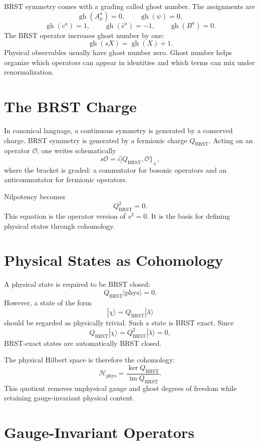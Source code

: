 BRST symmetry comes with a grading called ghost number. The assignments are
\[
    \operatorname{gh}(A_\mu^a)=0,
    \qquad
    \operatorname{gh}(\psi)=0,
\]
\[
    \operatorname{gh}(c^a)=1,
    \qquad
    \operatorname{gh}(\bar c^a)=-1,
    \qquad
    \operatorname{gh}(B^a)=0.
\]
The BRST operator increases ghost number by one:
\[
    \operatorname{gh}(sX)=\operatorname{gh}(X)+1.
\]
Physical observables usually have ghost number zero. Ghost number helps organize
which operators can appear in identities and which terms can mix under
renormalization.

\section{The BRST Charge}

In canonical language, a continuous symmetry is generated by a conserved charge.
BRST symmetry is generated by a fermionic charge \(Q_{\mathrm{BRST}}\). Acting on
an operator \(\mathcal{O}\), one writes schematically
\[
    s\mathcal{O}=i[Q_{\mathrm{BRST}},\mathcal{O}\}_{\pm},
\]
where the bracket is graded: a commutator for bosonic operators and an
anticommutator for fermionic operators.

Nilpotency becomes
\[
    Q_{\mathrm{BRST}}^2=0.
\]
This equation is the operator version of \(s^2=0\). It is the basis for defining
physical states through cohomology.

\section{Physical States as Cohomology}

A physical state is required to be BRST closed:
\[
    Q_{\mathrm{BRST}}|\mathrm{phys}\rangle=0.
\]
However, a state of the form
\[
    |\chi\rangle=Q_{\mathrm{BRST}}|\lambda\rangle
\]
should be regarded as physically trivial. Such a state is BRST exact. Since
\[
    Q_{\mathrm{BRST}}|\chi\rangle=Q_{\mathrm{BRST}}^2|\lambda\rangle=0,
\]
BRST-exact states are automatically BRST closed.

The physical Hilbert space is therefore the cohomology:
\[
    \mathcal{H}_{\mathrm{phys}}
    = \frac{\ker Q_{\mathrm{BRST}}}{\operatorname{im}Q_{\mathrm{BRST}}}.
\]
This quotient removes unphysical gauge and ghost degrees of freedom while
retaining gauge-invariant physical content.

\section{Gauge-Invariant Operators}

